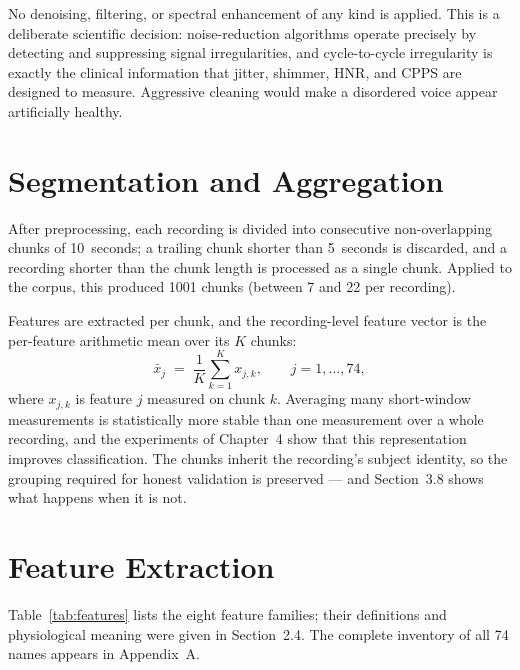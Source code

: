 No denoising, filtering, or spectral enhancement of any kind is
applied. This is a deliberate scientific decision: noise-reduction
algorithms operate precisely by detecting and suppressing signal
irregularities, and cycle-to-cycle irregularity is exactly the clinical
information that jitter, shimmer, HNR, and CPPS are designed to
measure. Aggressive cleaning would make a disordered voice appear
artificially healthy.

\section{Segmentation and Aggregation}

After preprocessing, each recording is divided into consecutive
non-overlapping chunks of 10~seconds; a trailing chunk shorter than
5~seconds is discarded, and a recording shorter than the chunk length
is processed as a single chunk. Applied to the corpus, this produced
1001 chunks (between 7 and 22 per recording).

Features are extracted per chunk, and the recording-level feature
vector is the per-feature arithmetic mean over its $K$ chunks:
\begin{equation}
\bar{x}_j \;=\; \frac{1}{K}\sum_{k=1}^{K} x_{j,k},
\qquad j = 1,\dots,74,
\label{eq:chunkmean}
\end{equation}
where $x_{j,k}$ is feature $j$ measured on chunk $k$. Averaging many
short-window measurements is statistically more stable than one
measurement over a whole recording, and the experiments of Chapter~4
show that this representation improves classification. The chunks
inherit the recording's subject identity, so the grouping required for
honest validation is preserved --- and Section~3.8 shows what happens
when it is not.

\section{Feature Extraction}

Table~\ref{tab:features} lists the eight feature families; their
definitions and physiological meaning were given in Section~2.4. The
complete inventory of all 74 names appears in Appendix~A.

